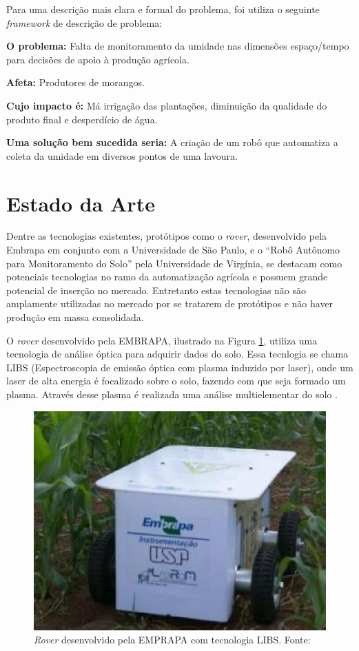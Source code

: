   Para uma descrição mais clara e formal do problema, foi utiliza o seguinte
  \textit{framework} de descrição de problema:

  \textbf{O problema:} Falta de monitoramento da umidade nas dimensões espaço/tempo
  para decisões de apoio à produção agrícola.

  \textbf{Afeta:} Produtores de morangos.

  \textbf{Cujo impacto é:} Má irrigação das plantações, diminuição da qualidade
  do produto final e desperdício de água.

  \textbf{Uma solução bem sucedida seria:} A criação de um robô que automatiza
  a coleta da umidade em diversos pontos de uma lavoura.

  \vfill
  \pagebreak

  \section{Estado da Arte}

  Dentre as tecnologias existentes, protótipos como o \textit{rover}, desenvolvido pela
  Embrapa em conjunto com a Universidade de São Paulo, e o “Robô Autônomo para
  Monitoramento do Solo” pela Universidade de Virgínia, se destacam como
  potenciais tecnologias no ramo da automatização agrícola e possuem grande
  potencial de inserção no mercado.  Entretanto estas tecnologias não são
  amplamente utilizadas no mercado por se tratarem de protótipos e não haver
  produção em massa consolidada.

  O \textit{rover} desenvolvido pela EMBRAPA, ilustrado na Figura \ref{fig02}, utiliza uma tecnologia de análise óptica
  para adquirir dados do solo. Essa tecnlogia se chama LIBS (Espectroscopia de
  emissão óptica com plasma induzido por laser), onde um laser de alta energia
  é focalizado sobre o solo, fazendo com que seja formado um plasma.
  Através desse plasma é realizada uma análise multielementar do solo \cite{ARCHILA2014}.

  \begin{figure}[h]
    \centering
    \includegraphics[keepaspectratio=true,scale=0.5]{figuras/fig02.eps}
    \caption{\textit{Rover} desenvolvido pela EMPRAPA com tecnologia LIBS. Fonte: \cite{ARCHILA2014}}
    \label{fig02}
  \end{figure}


